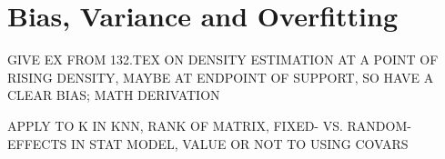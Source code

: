 \chapter{Bias, Variance and Overfitting}  
\label{chap:overfit} 

GIVE EX FROM 132.TEX ON DENSITY ESTIMATION AT A POINT OF RISING DENSITY,
MAYBE AT ENDPOINT OF SUPPORT, SO HAVE A CLEAR BIAS; MATH DERIVATION

APPLY TO K IN KNN, RANK OF MATRIX, FIXED- VS. RANDOM-EFFECTS IN STAT
MODEL, VALUE OR NOT TO USING COVARS

